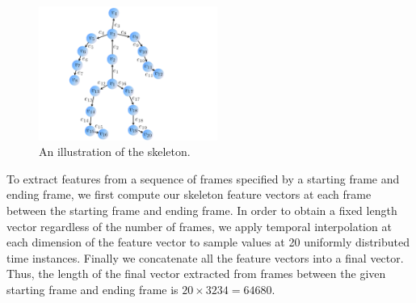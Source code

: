 \documentclass[10pt,twocolumn,letterpaper]{article}
\begin{document}
\begin{figure}[htb]
\begin{center}
\includegraphics[width=2.3in]{skeleton.pdf}
\caption{An illustration of the skeleton. \label{fig:skeleton}}
\end{center}
\end{figure}

To extract features from a sequence of frames specified by a starting frame and ending frame, we first compute our skeleton feature vectors at each frame between the starting frame and ending frame. In order to obtain a fixed length vector regardless of the number of frames, we apply temporal interpolation at each dimension of the feature vector to sample values at 20 uniformly distributed time instances. Finally we concatenate all the feature vectors into a final vector. Thus, the length of the final vector extracted from frames between the given starting frame and ending frame is $20 \times 3234 = 64680$.
\end{document}
